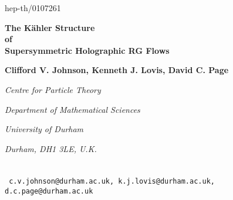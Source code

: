 \documentclass[a4paper,12pt]{article}
\begin{document}
  
  
\bigskip  
\hskip 4.7in\vbox{\baselineskip12pt  
\hbox{hep-th/0107261}}  
  
\bigskip  
\bigskip  
\bigskip  
\bigskip  
\bigskip  
\bigskip 
  
\begin{center}
{\Large \bf The K\"ahler Structure}\\
\bigskip
{\Large \bf of} \\
\bigskip
{\Large \bf Supersymmetric Holographic RG Flows}
  \end{center}
\bigskip  
\bigskip  
\bigskip  
\bigskip 
  
\centerline{\bf Clifford V. Johnson, Kenneth J.
  Lovis, David C. Page}
  
  
\bigskip  
\bigskip  
\bigskip  
  

\centerline{\it Centre  
for Particle Theory}
  \centerline{\it Department of Mathematical Sciences}  
\centerline{\it University of  
Durham}
\centerline{\it Durham, DH1 3LE, U.K.}  

\centerline{$\phantom{and}$}  

\bigskip  
 
  
\centerline{\small \tt  
  c.v.johnson@durham.ac.uk, k.j.lovis@durham.ac.uk, d.c.page@durham.ac.uk}  
  
\bigskip  
\bigskip  
\bigskip  

  
\begin{abstract}  
  \vskip 4pt We study the metrics on the families of moduli spaces
  arising from probing with a brane the ten and eleven dimensional
  supergravity solutions corresponding to renormalisation group flows
  of supersymmetric large $N$ gauge theory.  In comparing the geometry
  to the physics of the dual gauge theory, it is important to identify
  appropriate coordinates, and starting with the case of $SU(N)$ gauge
  theories flowing from ${\cal N}{=}4$ to ${\cal N}{=}1$ {\it via} a
  mass term, we demonstrate that the metric is K\"ahler, and solve for
  the K\"ahler potential everywhere along the flow. We show that the
  asymptotic form of the K\"ahler potential, and hence the peculiar
  conical form of the metric, follows from special properties of the
  gauge theory.  Furthermore, we find the analogous K\"ahler structure
  for the ${\cal N}{=}4$ preserving Coulomb branch flows, and for an
  ${\cal N}{=}2$ flow. In addition, we establish similar properties
  for two eleven dimensional flow geometries recently presented in the
  literature, one of which has a deformation of the conifold as its
  moduli space.  In all of these cases, we notice that the K\"ahler
  potential appears to satisfy a simple universal differential
  equation. We prove that this equation arises for all purely Coulomb
  branch flows dual to both ten and eleven dimensional geometries, and
  conjecture that the equation holds much more generally.
\end{abstract}  
\newpage  
\baselineskip=18pt  
\setcounter{footnote}{0}  
  
\end{document}
